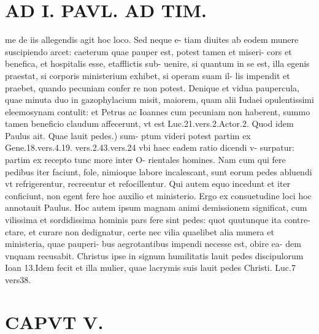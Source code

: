 \documentclass{article}
\begin{document}
\begin{pages}
\section*{AD I. PAVL. AD TIM. }
\marginpar{[ p.A0O ]}\pstart me de iis allegendis agit hoc loco. Sed neque e- tiam diuites ab eodem munere suscipiendo arcet: caeterum quae pauper est, potest tamen et miseri- cors et benefica, et hospitalis esse, etafflictis sub- uenire, si quantum in se est, illa egenis praestat, si corporis ministerium exhibet, si operam suam il- lis impendit et praebet, quando pecuniam confer re non potest. Denique et vidua paupercula, quae minuta duo in gazophylacium misit, maiorem, quam alii Iudaei opulentissimi eleemosynam contulit: et Petrus ac Ioannes cum pecuniam non haberent, summo tamen beneficio claudum affecerunt, vt est Luc.21.vers.2.Actor.2. Quod idem Paulus ait. Quae lauit pedes.) sum- ptum videri potest partim ex Gene.18.vers.4.19. vers.2.43.vers.24 vbi haec eadem ratio dicendi v- surpatur: partim ex recepto tunc more inter O- rientales homines. Nam cum qui fere pedibus iter faciunt, fole, nimioque labore incalescant, sunt eorum pedes abluendi vt refrigerentur, recreentur et refocillentur. Qui autem equo incedunt et iter conficiunt, non egent fere hoc auxilio et ministerio. Ergo ex consuetudine loci hoc annotauit Paulus. Hoc autem ipsum magnam animi demissionem significat, cum vilissima et sordidissima hominis pars fere sint pedes: quot quutunque ita contre- ctare, et curare non dedignatur, certe nec vilia quaelibet alia munera et ministeria, quae pauperi- bus aegrotantibus impendi necesse est, obire ea- dem vnquam recusabit. Christus ipse in signum humilitatis lauit pedes discipulorum Ioan 13.Idem fecit et illa mulier, quae lacrymis suis lauit pedes Christi. Luc.7 vers38.  \pend
\section*{CAPVT  V. }
\marginpar{[ p.281 ]}\pstart {}
{}

\end{pages}
\end{document}
